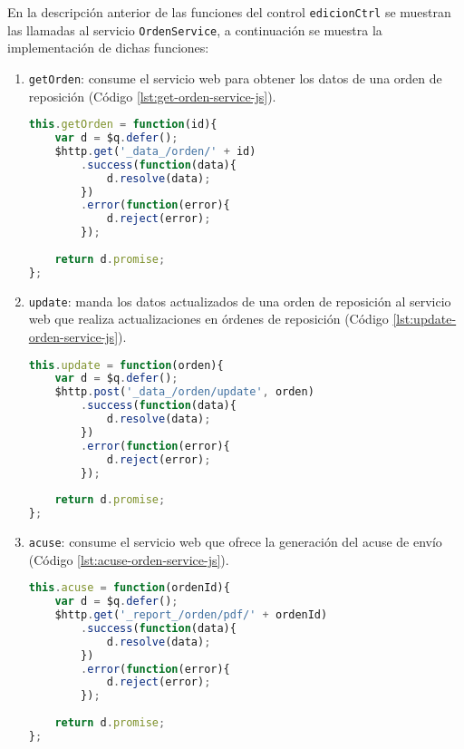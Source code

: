En la descripción anterior de las funciones del control \texttt{edicionCtrl} se muestran las llamadas al servicio \texttt{OrdenService}, a continuación se muestra la implementación de dichas funciones:

\begin{enumerate}
	\item \texttt{getOrden}: consume el servicio web para obtener los datos de una orden de reposición (Código \ref{lst:get-orden-service-js}).
\begin{lstlisting}[language=Javascript, caption={Función para consumir el servicio web que obtiene los datos de una orden de reposición.}, captionpos=b, label={lst:get-orden-service-js}]
this.getOrden = function(id){
	var d = $q.defer();
	$http.get('_data_/orden/' + id)
		.success(function(data){
			d.resolve(data);
		})
		.error(function(error){
			d.reject(error);
		});
	
	return d.promise;
};
\end{lstlisting}

	\item \texttt{update}: manda los datos actualizados de una orden de reposición al servicio web que realiza actualizaciones en órdenes de reposición (Código \ref{lst:update-orden-service-js}).
\begin{lstlisting}[language=Javascript, caption={Función para actualizar los datos de una orden de reposición}, captionpos=b, label={lst:update-orden-service-js}]
this.update = function(orden){
	var d = $q.defer();
	$http.post('_data_/orden/update', orden)
		.success(function(data){
			d.resolve(data);
		})
		.error(function(error){
			d.reject(error);
		});
	
	return d.promise;
};
\end{lstlisting}

	\item \texttt{acuse}: consume el servicio web que ofrece la generación del acuse de envío (Código \ref{lst:acuse-orden-service-js}).
\begin{lstlisting}[language=Javascript, caption={Función para mandar la generación del acuse de envío de una orden de reposición.}, captionpos=b, label={lst:acuse-orden-service-js}]
this.acuse = function(ordenId){
	var d = $q.defer();
	$http.get('_report_/orden/pdf/' + ordenId)
		.success(function(data){
			d.resolve(data);
		})
		.error(function(error){
			d.reject(error);
		});
	
	return d.promise;
};
\end{lstlisting}

\end{enumerate}

